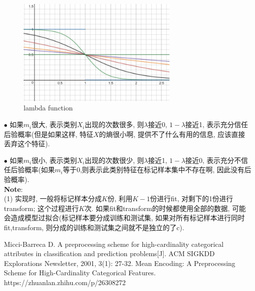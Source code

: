 \documentclass[UTF8,a4paper,11pt]{article}
\begin{document}
\begin{figure}[htbp]
\includegraphics[width=0.7\textwidth]{images/lambda_function.jpg}
\centering
\caption{lambda function}	
\end{figure}

$\bullet$ 如果$m_i$很大, 表示类别$X_i$出现的次数很多, 则$\lambda$接近0, $1-\lambda$接近1, 表示充分信任后验概率(但是如果这样, 特征$X$的熵很小啊, 提供不了什么有用的信息, 应该直接丢弃这个特征).

$\bullet$ 如果$m_i$很小, 表示类别$X_i$出现的次数很少, 则$\lambda$接近1, $1-\lambda$接近0, 表示充分不信任后验概率(如果$m_i$等于0,则表示此类别特征在标记样本集中不存在啊, 因此没有后验概率).\\

\noindent \textbf{Note}: \\
(1) 实现时, 一般将标记样本分成$K$份, 利用$K-1$份进行fit, 对剩下的1份进行transform; 这个过程进行$K$次. 如果fit和transform的时候都使用全部的数据, 可能会造成模型过拟合(标记样本要分成训练和测试集, 如果对所有标记样本进行同时fit,transform, 则分成的训练和测试集之间就不是独立的了c).	
	
\begin{thebibliography}{9}
 Micci-Barreca D. A preprocessing scheme for high-cardinality categorical attributes in classification and prediction problems[J]. ACM SIGKDD Explorations Newsletter, 2001, 3(1): 27-32.
 Mean Encoding: A Preprocessing Scheme for High-Cardinality Categorical Features.
 https://zhuanlan.zhihu.com/p/26308272
\end{thebibliography}	
\end{document}

